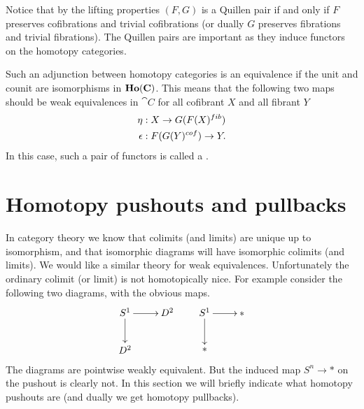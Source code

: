 
Notice that by the lifting properties $(F,G)$ is a Quillen pair if and only if $F$ preserves cofibrations and trivial cofibrations (or dually $G$ preserves fibrations and trivial fibrations). The Quillen pairs are important as they induce functors on the homotopy categories.


Such an adjunction between homotopy categories is an equivalence if the unit and counit are isomorphisms in $\mathbf{Ho}(\mathbf{C})$. This means that the following two maps should be weak equivalences in $\cat{C}$ for all cofibrant $X$ and all fibrant $Y$
\begin{align*}
	\eta &: X \to G(F(X)^{fib}) \\
	\epsilon &: F(G(Y)^{cof}) \to Y.
\end{align*}
In this case, such a pair of functors is called a .



\section{Homotopy pushouts and pullbacks}
In category theory we know that colimits (and limits) are unique up to isomorphism, and that isomorphic diagrams will have isomorphic colimits (and limits). We would like a similar theory for weak equivalences. Unfortunately the ordinary colimit (or limit) is not homotopically nice. For example consider the following two diagrams, with the obvious maps.
\[\xymatrix{
	S^1 \ar[r] \ar[d] & D^2 \\
	D^2 &
} \qquad \xymatrix{
	S^1 \ar[r] \ar[d] & \ast \\
	\ast &
} \]
The diagrams are pointwise weakly equivalent. But the induced map $S^n \to \ast$ on the pushout is clearly not. In this section we will briefly indicate what homotopy pushouts are (and dually we get homotopy pullbacks).

